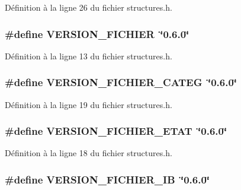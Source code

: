 Définition à la ligne 26 du fichier structures.h.

\subsubsection[{VERSION\_\-FICHIER}]{\setlength{\rightskip}{0pt plus 5cm}\#define VERSION\_\-FICHIER~\char`\"{}0.6.0\char`\"{}}\label{structures_8h_ab543f4bce79f29c3d34f92ebec03c9fe}


Définition à la ligne 13 du fichier structures.h.

\subsubsection[{VERSION\_\-FICHIER\_\-CATEG}]{\setlength{\rightskip}{0pt plus 5cm}\#define VERSION\_\-FICHIER\_\-CATEG~\char`\"{}0.6.0\char`\"{}}\label{structures_8h_a1cb86b24780a16be7cdbb0abe9a14af6}


Définition à la ligne 19 du fichier structures.h.

\subsubsection[{VERSION\_\-FICHIER\_\-ETAT}]{\setlength{\rightskip}{0pt plus 5cm}\#define VERSION\_\-FICHIER\_\-ETAT~\char`\"{}0.6.0\char`\"{}}\label{structures_8h_ac67b9c98ee8d1934919e426bcdada8a1}


Définition à la ligne 18 du fichier structures.h.

\subsubsection[{VERSION\_\-FICHIER\_\-IB}]{\setlength{\rightskip}{0pt plus 5cm}\#define VERSION\_\-FICHIER\_\-IB~\char`\"{}0.6.0\char`\"{}}\label{structures_8h_ab3e20dc1e44d90436b46643e52d92adf}


